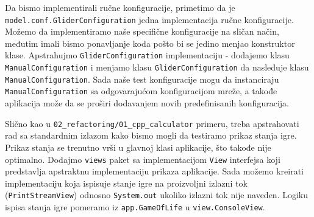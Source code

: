 Da bismo implementirali ručne konfiguracije, primetimo da je \texttt{model.conf.GliderConfiguration} jedna implementacija ručne konfiguracije. Možemo da implementiramo naše specifične konfiguracije na sličan način, međutim imali bismo ponavljanje koda pošto bi se jedino menjao konstruktor klase. Apstrahujmo \texttt{GliderConfiguration} implementaciju - dodajemo klasu \texttt{ManualConfiguration} i menjamo klasu \texttt{GliderConfiguration} da nasleđuje klasu \texttt{ManualConfiguration}. Sada naše test konfiguracije mogu da instanciraju \texttt{ManualConfiguration} sa odgovarajućom konfiguracijom mreže, a takođe aplikacija može da se proširi dodavanjem novih predefinisanih konfiguracija.

Slično kao u \texttt{02\_refactoring/01\_cpp\_calculator} primeru, treba apstrahovati rad sa standardnim izlazom kako bismo mogli da testiramo prikaz stanja igre. Prikaz stanja se trenutno vrši u glavnoj klasi aplikacije, što takođe nije optimalno. Dodajmo \texttt{views} paket sa implementacijom \texttt{View} interfejsa koji predstavlja apstraktnu implementaciju prikaza aplikacije. Sada možemo kreirati implementaciju koja ispisuje stanje igre na proizvoljni izlazni tok (\texttt{PrintStreamView}) odnosno \texttt{System.out} ukoliko izlazni tok nije naveden. Logiku ispisa stanja igre pomeramo iz \texttt{app.GameOfLife} u \texttt{view.ConsoleView}.
